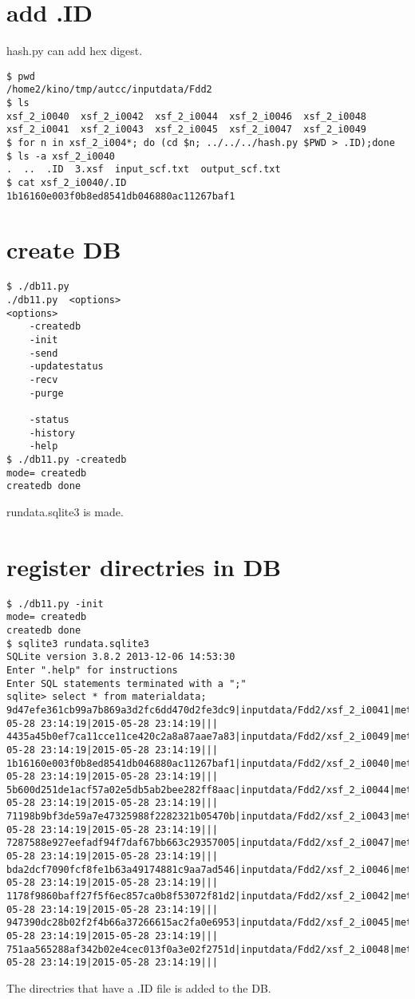 \documentclass[a4paper]{article}
\begin{document}
\section{add .ID}
hash.py can add hex digest.
\begin{verbatim}
$ pwd
/home2/kino/tmp/autcc/inputdata/Fdd2
$ ls
xsf_2_i0040  xsf_2_i0042  xsf_2_i0044  xsf_2_i0046  xsf_2_i0048
xsf_2_i0041  xsf_2_i0043  xsf_2_i0045  xsf_2_i0047  xsf_2_i0049
$ for n in xsf_2_i004*; do (cd $n; ../../../hash.py $PWD > .ID);done
$ ls -a xsf_2_i0040
.  ..  .ID  3.xsf  input_scf.txt  output_scf.txt
$ cat xsf_2_i0040/.ID 
1b16160e003f0b8ed8541db046880ac11267baf1
\end{verbatim}

\section{create DB}
\begin{verbatim}
$ ./db11.py
./db11.py  <options>
<options>
	-createdb
	-init
	-send
	-updatestatus
	-recv
	-purge

	-status
	-history
	-help
$ ./db11.py -createdb
mode= createdb
createdb done
\end{verbatim}
rundata.sqlite3 is made.

\section{register directries in DB}
\begin{verbatim}
$ ./db11.py -init
mode= createdb
createdb done
$ sqlite3 rundata.sqlite3
SQLite version 3.8.2 2013-12-06 14:53:30
Enter ".help" for instructions
Enter SQL statements terminated with a ";"
sqlite> select * from materialdata;
9d47efe361cb99a7b869a3d2fc6dd470d2fe3dc9|inputdata/Fdd2/xsf_2_i0041|metal1|new|0|idle|2015-05-28 23:14:19|2015-05-28 23:14:19|||
4435a45b0ef7ca11cce11ce420c2a8a87aae7a83|inputdata/Fdd2/xsf_2_i0049|metal1|new|0|idle|2015-05-28 23:14:19|2015-05-28 23:14:19|||
1b16160e003f0b8ed8541db046880ac11267baf1|inputdata/Fdd2/xsf_2_i0040|metal1|new|0|idle|2015-05-28 23:14:19|2015-05-28 23:14:19|||
5b600d251de1acf57a02e5db5ab2bee282ff8aac|inputdata/Fdd2/xsf_2_i0044|metal1|new|0|idle|2015-05-28 23:14:19|2015-05-28 23:14:19|||
71198b9bf3de59a7e47325988f2282321b05470b|inputdata/Fdd2/xsf_2_i0043|metal1|new|0|idle|2015-05-28 23:14:19|2015-05-28 23:14:19|||
7287588e927eefadf94f7daf67bb663c29357005|inputdata/Fdd2/xsf_2_i0047|metal1|new|0|idle|2015-05-28 23:14:19|2015-05-28 23:14:19|||
bda2dcf7090fcf8fe1b63a49174881c9aa7ad546|inputdata/Fdd2/xsf_2_i0046|metal1|new|0|idle|2015-05-28 23:14:19|2015-05-28 23:14:19|||
1178f9860baff27f5f6ec857ca0b8f53072f81d2|inputdata/Fdd2/xsf_2_i0042|metal1|new|0|idle|2015-05-28 23:14:19|2015-05-28 23:14:19|||
947390dc28b02f2f4b66a37266615ac2fa0e6953|inputdata/Fdd2/xsf_2_i0045|metal1|new|0|idle|2015-05-28 23:14:19|2015-05-28 23:14:19|||
751aa565288af342b02e4cec013f0a3e02f2751d|inputdata/Fdd2/xsf_2_i0048|metal1|new|0|idle|2015-05-28 23:14:19|2015-05-28 23:14:19|||
\end{verbatim}
The directries that have a .ID file is added to the DB.
\end{document}
